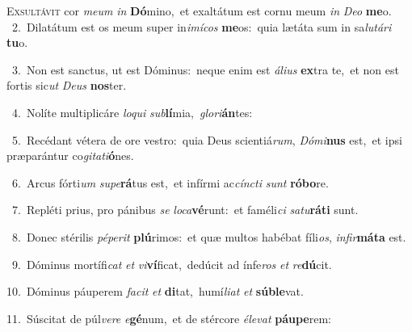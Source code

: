 \lettrine{\initial\textcolor{\initialcolor}{E}}{xsultávit} cor \textit{me}\-\textit{um} \textit{in} \textbf{Dó}\-mino,~\star et exaltátum est cornu meum \textit{in} \textit{De}\-\textit{o} \textbf{me}\-o.\\
{\numbfont\textcolor{\numbcolor}{~2.}}~Dilatátum est os meum super in\-\textit{i}\-\textit{mí}\textit{cos} \textbf{me}\-os:~\star quia lætáta sum in sa\-\textit{lu}\-\textit{tá}\textit{ri} \textbf{tu}\-o.\par
{\numbfont\textcolor{\numbcolor}{~3.}}~Non est sanctus, ut est Dóminus:~\dagger neque enim est \textit{á}\-\textit{li}\textit{us} \textbf{ex}\-tra te,~\star et non est fortis sic\textit{ut} \textit{De}\-\textit{us} \textbf{nos}\-ter.\par
{\numbfont\textcolor{\numbcolor}{~4.}}~Nolíte multiplicáre \textit{lo}\-\textit{qui} \textit{sub}\-\textbf{lí}mia,~\star \textit{glo}\-\textit{ri}\textbf{án}tes:\par
{\numbfont\textcolor{\numbcolor}{~5.}}~Recédant vétera de ore vestro:~\dagger quia Deus scientiá\-\textit{rum}\-, \textit{Dó}\-\textit{mi}\textbf{nus} est,~\star et ipsi præparántur co\-\textit{gi}\-\textit{ta}\textit{ti}\textbf{ó}nes.\par
{\numbfont\textcolor{\numbcolor}{~6.}}~Arcus fórti\textit{um} \textit{su}\-\textit{pe}\textbf{rá}tus est,~\star et infírmi ac\-\textit{cínc}\-\textit{ti} \textit{sunt} \textbf{ró}\-\textbf{bo}re.\par
{\numbfont\textcolor{\numbcolor}{~7.}}~Repléti prius, pro pánibus \textit{se} \textit{lo}\-\textit{ca}\textbf{vé}runt:~\star et faméli\textit{ci} \textit{sa}\-\textit{tu}\textbf{rá}\textbf{ti} sunt.\par
{\numbfont\textcolor{\numbcolor}{~8.}}~Donec stérilis \textit{pé}\-\textit{pe}\textit{rit} \textbf{plú}\-rimos:~\star et quæ multos habébat fíli\-\textit{os}\-, \textit{in}\-\textit{fir}\textbf{má}\textbf{ta} est.\par
{\numbfont\textcolor{\numbcolor}{~9.}}~Dóminus mortífi\textit{cat} \textit{et} \textit{vi}\-\textbf{ví}ficat,~\star dedúcit ad ínfe\textit{ros} \textit{et} \textit{re}\-\textbf{dú}cit.\par
{\numbfont\textcolor{\numbcolor}{10.}}~Dóminus páuperem \textit{fa}\-\textit{cit} \textit{et} \textbf{di}\-tat,~\star humí\-\textit{li}\-\textit{at} \textit{et} \textbf{súb}\-\textbf{le}vat.\par
{\numbfont\textcolor{\numbcolor}{11.}}~Súscitat de púl\-\textit{ve}\-\textit{re} \textit{e}\-\textbf{gé}num,~\star et de stércore \textit{é}\-\textit{le}\textit{vat} \textbf{páu}\-\textbf{pe}rem:\par
